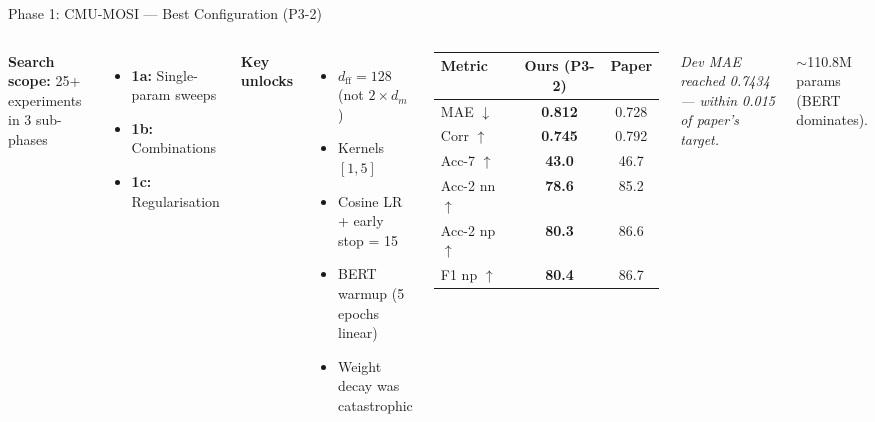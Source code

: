 \documentclass[aspectratio=169,10pt]{beamer}
\begin{document}
\begin{frame}{Phase 1: CMU-MOSI --- Best Configuration (P3-2)}
  \begin{columns}[T]
    \small
    \textbf{Search scope:} 25+ experiments in 3 sub-phases
    \begin{itemize}
      \item \textbf{1a:} Single-param sweeps
      \item \textbf{1b:} Combinations
      \item \textbf{1c:} Regularisation
    \end{itemize}
    \vspace{0.3em}
    \textbf{Key unlocks}
    \begin{itemize}
      \item $d_{\text{ff}} = 128$ (not $2{\times}d_m$)
      \item Kernels $[1, 5]$
      \item Cosine LR + early stop = 15
      \item BERT warmup (5 epochs linear)
      \item Weight decay was catastrophic
    \end{itemize}

    \centering\small
    \begin{tabular}{lcc}
      \toprule
      \textbf{Metric} & \textbf{Ours (P3-2)} & \textbf{Paper} \\
      \midrule
      MAE $\downarrow$            & \textbf{0.812} & 0.728 \\
      Corr $\uparrow$             & \textbf{0.745} & 0.792 \\
      Acc-7 $\uparrow$            & \textbf{43.0}  & 46.7 \\
      Acc-2 nn $\uparrow$         & \textbf{78.6}  & 85.2 \\
      Acc-2 np $\uparrow$         & \textbf{80.3}  & 86.6 \\
      F1 np $\uparrow$            & \textbf{80.4}  & 86.7 \\
      \bottomrule
    \end{tabular}
    \vspace{0.5em}

    \footnotesize\emph{Dev MAE reached 0.7434 --- within 0.015 of paper's target.}

    \vspace{0.3em}
    \footnotesize $\sim$110.8M params (BERT dominates).
  \end{columns}
\end{frame}
\end{document}
